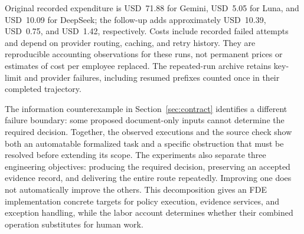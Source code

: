 Original recorded expenditure is USD~71.88 for Gemini, USD~5.05 for Luna, and USD~10.09 for
DeepSeek; the follow-up adds approximately USD~10.39, USD~0.75, and USD~1.42, respectively.
Costs include recorded failed attempts and depend on provider routing, caching, and retry
history. They are reproducible accounting observations for these runs, not permanent prices
or estimates of cost per employee replaced. The repeated-run archive retains key-limit and
provider failures, including resumed prefixes counted once in their completed trajectory.

The information counterexample in Section~\ref{sec:contract} identifies a different failure
boundary: some proposed document-only inputs cannot determine the required decision. Together,
the observed executions and the source check show both an automatable formalized task and
a specific obstruction that must be resolved before extending its scope.
The experiments also separate three engineering objectives: producing the required decision,
preserving an accepted evidence record, and delivering the entire route repeatedly. Improving
one does not automatically improve the others. This decomposition gives an FDE implementation
concrete targets for policy execution, evidence services, and exception handling, while the
labor account determines whether their combined operation substitutes for human work.
